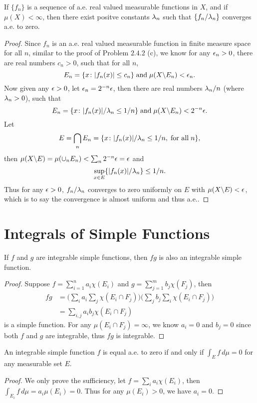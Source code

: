 \begin{pro}%
	If $\{f_n\}$ is a sequence of a.e. real valued measurable functions in $X$, and if $\mu(X)<\infty$, then there exist positve constants $\lambda_n$ such that $\{f_n/\lambda_n\}$ converges a.e. to zero.
\end{pro}
\begin{proof}
	Since $f_n$ is an a.e. real valued measurable function in finite measure space for all $n$, similar to the proof of Problem $2.4.2$ (c), we know for any $\epsilon_n>0$, there are real numbers $c_n>0$, such that for all $n$,
	\[E_n=\{x\colon |f_n(x)|\leq c_n\}\;\mbox{and}\;\mu(X\backslash E_n)< \epsilon_n.\]
	Now given any $\epsilon>0$, let $\epsilon_n=2^{-n}\epsilon$, then there are real numbers $\lambda_n/n$ (where $\lambda_n>0$), such that
	\[E_n=\{x\colon |f_n(x)|/\lambda_n\leq 1/n\}\;\mbox{and}\;\mu(X\backslash E_n)< 2^{-n}\epsilon.\]
	Let
	\[E=\bigcap_n E_n=\{x\colon |f_n(x)|/\lambda_n\leq 1/n,\;\mbox{for all}\;n\},\]
	then $\mu(X\backslash E)=\mu(\cup_n E_n)<\sum_n 2^{-n}\epsilon=\epsilon$ and
	\[\sup_{x\in E}\{|f_n(x)|/\lambda_n\}\leq 1/n.\]
	Thus for any $\epsilon>0$, $f_n/\lambda_n$ converges to zero uniformly on $E$ with $\mu(X\backslash E)<\epsilon$, which is to say the convergence is almost uniform and thus a.e..
\end{proof}

\section{Integrals of Simple Functions}
\begin{pro}%
	If $f$ and $g$ are integrable simple functions, then $fg$ is  also an integrable simple function.
\end{pro}
\begin{proof}
	Suppose $f=\sum_{i=1}^n a_i\chi(E_i)$ and $g=\sum_{j=1}^m b_j\chi(F_j)$, then
	\begin{align*}
		fg&=\bigg(\sum_ia_i\sum_j\chi(E_i\cap F_j)\bigg)
		    \bigg(\sum_jb_j\sum_i\chi(E_i\cap F_j)\bigg)\\
		  &=\sum_{i,j}a_ib_j\chi(E_i\cap F_j)
	\end{align*} is a simple function.
	For any $\mu(E_i\cap F_j)=\infty$, we know $a_i=0$ and $b_j=0$ since both $f$ and $g$ are integrable, thus $fg$ is integrable.
\end{proof}

\begin{pro}%
	An integrable simple function $f$ is equal a.e. to zero if and only if $\int_E f\,d\mu=0$ for any measurable set $E$.
\end{pro}
\begin{proof}
	We only prove the sufficiency, let $f=\sum_i a_i\chi(E_i)$, then $\int_{E_i} f\,d\mu=a_i\mu(E_i)=0$. Thus for any $\mu(E_i)>0$, we have $a_i=0$.
\end{proof}

